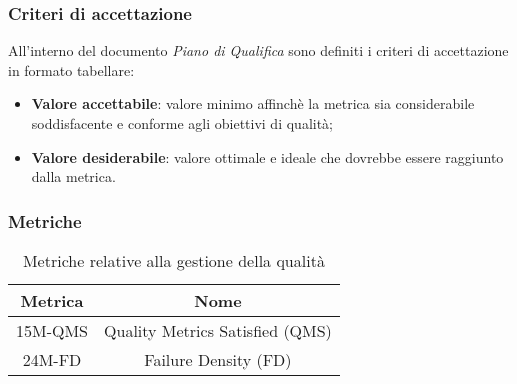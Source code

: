 \subsubsection{Criteri di accettazione}
All'interno del documento \textit{Piano di Qualifica} sono definiti i criteri di accettazione in formato tabellare:
\begin{itemize}
	\item \textbf{Valore accettabile}: valore minimo affinchè la metrica sia considerabile soddisfacente e conforme agli obiettivi di qualità;
	\item \textbf{Valore desiderabile}: valore ottimale e ideale che dovrebbe essere raggiunto dalla metrica.
\end{itemize}

\subsubsection{Metriche}
\begin{table}[h]
	\centering
	\caption{Metriche relative alla gestione della qualità}
	\begin{tabular}{|c|c|}
		\hline
		\textbf{Metrica} & \textbf{Nome}                   \\
		\hline
		15M-QMS          & Quality Metrics Satisfied (QMS) \\
		24M-FD           & Failure Density (FD)            \\
		\hline
	\end{tabular}
\end{table}
